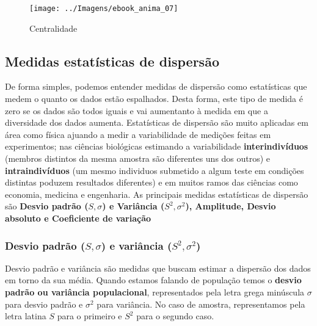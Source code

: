\documentclass[12pt,]{style/krantz}
\theoremstyle{definition}
\theoremstyle{definition}
\theoremstyle{definition}
\theoremstyle{remark}
\begin{document}
\begin{figure}[H]

{\centering \texttt{[image: ../Imagens/ebook\_anima\_07]} 

}

\caption{Centralidade}\label{fig:fig08}
\end{figure}

\hypertarget{medidas-estatisticas-de-dispersao}{%
\subsection{Medidas estatísticas de dispersão}\label{medidas-estatisticas-de-dispersao}}

De forma simples, podemos entender medidas de dispersão como estatísticas que medem o quanto os dados estão espalhados. Desta forma, este tipo de medida é zero se os dados são todos iguais e vai aumentanto à medida em que a diversidade dos dados aumenta.
Estatísticas de dispersão são muito aplicadas em área como física ajuando a medir a variabilidade de medições feitas em experimentos; nas ciências biológicas estimando a variabilidade \textbf{interindivíduos} (membros distintos da mesma amostra são diferentes uns dos outros) e \textbf{intraindivíduos} (um mesmo individuos submetido a algum teste em condições distintas poduzem resultados diferentes) e em muitos ramos das ciências como economia, medicina e engenharia.
As principais medidas estatísticas de dispersão são \textbf{Desvio padrão (\(S,\sigma\)) e Variância (\(S^2,\sigma^2\)), Amplitude, Desvio absoluto e Coeficiente de variação}

\hypertarget{desvio-padrao-ssigma-e-variancia-s2sigma2}{%
\subsubsection{\texorpdfstring{Desvio padrão (\(S,\sigma\)) e variância (\(S^2,\sigma^2\))}{Desvio padrão (S,\textbackslash{}sigma) e variância (S\^{}2,\textbackslash{}sigma\^{}2)}}\label{desvio-padrao-ssigma-e-variancia-s2sigma2}}

Desvio padrão e variância são medidas que buscam estimar a dispersão dos dados em torno da sua média. Quando estamos falando de população temos o \textbf{desvio padrão ou variância populacional}, representados pela letra grega minúscula \(\sigma\) para desvio padrão e \(\sigma^2\) para variância. No caso de amostra, representamos pela letra latina \(S\) para o primeiro e \(S^2\) para o segundo caso.
\end{document}
